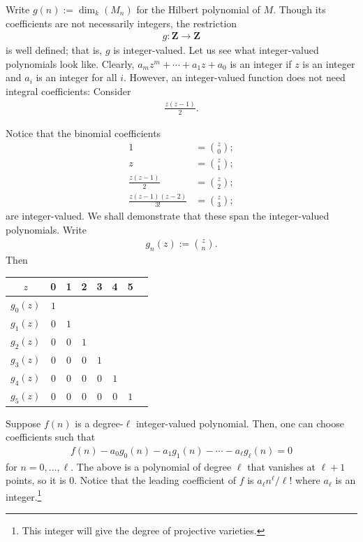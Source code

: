 \documentclass [11 pt, oneside, margin = 1 in] {article}
\begin{document}
Write $g(n) := \dim_k(M_n)$ for the Hilbert polynomial of $M$. Though its coefficients are not necessarily integers, the restriction
\begin{align*}
	g:\mathbf{Z}\longrightarrow \mathbf{Z}
\end{align*}
is well defined; that is, $g$ is integer-valued. Let us see what integer-valued polynomials look like. Clearly, $a_mz^m + \cdots + a_1z + a_0$ is an integer if $z$ is an integer and $a_i$ is an integer for all $i$. However, an integer-valued function does not need integral coefficients: Consider
\begin{align*}
	\frac{z(z-1)}{2}.
\end{align*}

Notice that the binomial coefficients
\begin{align*}
	1 &= \binom{z}{0};\\
	z &= \binom{z}{1};\\
	\frac{z(z-1)}{2} &= \binom{z}{2};\\
	\frac{z(z-1) (z-2)}{3!}&= \binom{z}{3};
\end{align*}
are integer-valued. We shall demonstrate that these span the integer-valued polynomials. Write 
\begin{align*}
	g_n(z) := \binom{z}{n}.
\end{align*}
Then
\begin{center}
	\begin{tabular}{cccccccc}
		$z$&0&1&2&3&4&5\\
    		\midrule
		 $g_0(z)$& $1$ &     &     &    \\
		 $g_1(z)$& $0$ & $1$ &     &    \\
		 $g_2(z)$& $0$ & $0$ & $1$ &    \\
		 $g_3(z)$& $0$ & $0$ & $0$ & $1$\\
		 $g_4(z)$& $0$ & $0$ & $0$ & $0$ & $1$\\
		 $g_5(z)$& $0$ & $0$ & $0$ & $0$ & $0$ & $1$
	\end{tabular}
\end{center}
Suppose $f(n)$ is a degree-$\ell$ integer-valued polynomial. Then, one can choose coefficients such that
\begin{align*}
	f(n) -  a_0g_0(n) -  a_1g_1(n) - \cdots - a_\ell g_\ell (n) =0
\end{align*}
for $n = 0,\hdots, \ell$. The above is a polynomial of degree $\ell$ that vanishes at $\ell + 1$ points, so it is $0$. Notice that the leading coefficient of $f$ is $a_\ell n^\ell / \ell!$ where $a_\ell$ is an integer.\footnote{This integer will give the degree of projective varieties.}
\end{document}
